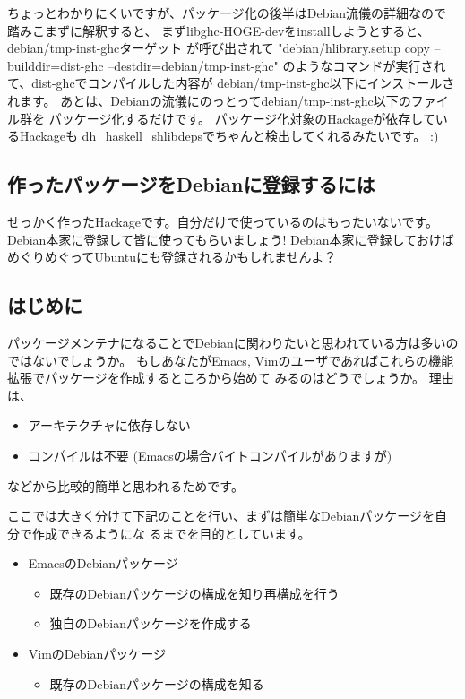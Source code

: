 \documentclass[mingoth,a4paper]{jsarticle}
\begin{document}
ちょっとわかりにくいですが、パッケージ化の後半はDebian流儀の詳細なので
踏みこまずに解釈すると、
まずlibghc-HOGE-devをinstallしようとすると、debian/tmp-inst-ghcターゲット
が呼び出されて
"debian/hlibrary.setup copy --builddir=dist-ghc --destdir=debian/tmp-inst-ghc"
のようなコマンドが実行されて、dist-ghcでコンパイルした内容が
debian/tmp-inst-ghc以下にインストールされます。
あとは、Debianの流儀にのっとってdebian/tmp-inst-ghc以下のファイル群を
パッケージ化するだけです。
パッケージ化対象のHackageが依存しているHackageも
dh\_haskell\_shlibdepsでちゃんと検出してくれるみたいです。 :)

\subsection{作ったパッケージをDebianに登録するには}

せっかく作ったHackageです。自分だけで使っているのはもったいないです。
Debian本家に登録して皆に使ってもらいましょう!
Debian本家に登録しておけばめぐりめぐってUbuntuにも登録されるかもしれませんよ？


\subsection{はじめに}

パッケージメンテナになることでDebianに関わりたいと思われている方は多いのではないでしょうか。
もしあなたがEmacs, Vimのユーザであればこれらの機能拡張でパッケージを作成するところから始めて
みるのはどうでしょうか。
理由は、
\begin{itemize}
 \item アーキテクチャに依存しない
 \item コンパイルは不要 (Emacsの場合バイトコンパイルがありますが)
\end{itemize}
などから比較的簡単と思われるためです。

ここでは大きく分けて下記のことを行い、まずは簡単なDebianパッケージを自分で作成できるようにな
るまでを目的としています。

\begin{itemize}
  \item EmacsのDebianパッケージ
    \begin{itemize}
      \item 既存のDebianパッケージの構成を知り再構成を行う
      \item 独自のDebianパッケージを作成する
    \end{itemize}
  \item VimのDebianパッケージ
    \begin{itemize}
      \item 既存のDebianパッケージの構成を知る
    \end{itemize}
\end{itemize}
\end{document}
